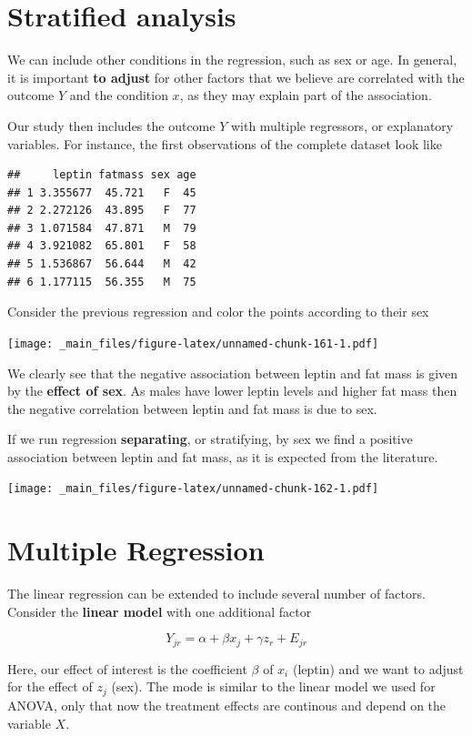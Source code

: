 \documentclass[
]{book}
\begin{document}
\hypertarget{stratified-analysis}{%
\section{Stratified analysis}\label{stratified-analysis}}

We can include other conditions in the regression, such as sex or age. In general, it is important \textbf{to adjust} for other factors that we believe are correlated with the outcome \(Y\) and the condition \(x\), as they may explain part of the association.

Our study then includes the outcome \(Y\) with multiple regressors, or explanatory variables. For instance, the first observations of the complete dataset look like

\begin{verbatim}
##     leptin fatmass sex age
## 1 3.355677  45.721   F  45
## 2 2.272126  43.895   F  77
## 3 1.071584  47.871   M  79
## 4 3.921082  65.801   F  58
## 5 1.536867  56.644   M  42
## 6 1.177115  56.355   M  75
\end{verbatim}

Consider the previous regression and color the points according to their sex

\texttt{[image: \_main\_files/figure-latex/unnamed-chunk-161-1.pdf]}

We clearly see that the negative association between leptin and fat mass is given by the \textbf{effect of sex}. As males have lower leptin levels and higher fat mass then the negative correlation between leptin and fat mass is due to sex.

If we run regression \textbf{separating}, or stratifying, by sex we find a positive association between leptin and fat mass, as it is expected from the literature.

\texttt{[image: \_main\_files/figure-latex/unnamed-chunk-162-1.pdf]}

\hypertarget{multiple-regression}{%
\section{Multiple Regression}\label{multiple-regression}}

The linear regression can be extended to include several number of factors. Consider the \textbf{linear model} with one additional factor

\[Y_{jr} = \alpha + \beta x_j +\gamma z_{r}+E_{jr}\]

Here, our effect of interest is the coefficient \(\beta\) of \(x_i\) (leptin) and we want to adjust for the effect of \(z_j\) (sex). The mode is similar to the linear model we used for ANOVA, only that now the treatment effects are continous and depend on the variable \(X\).
\end{document}
